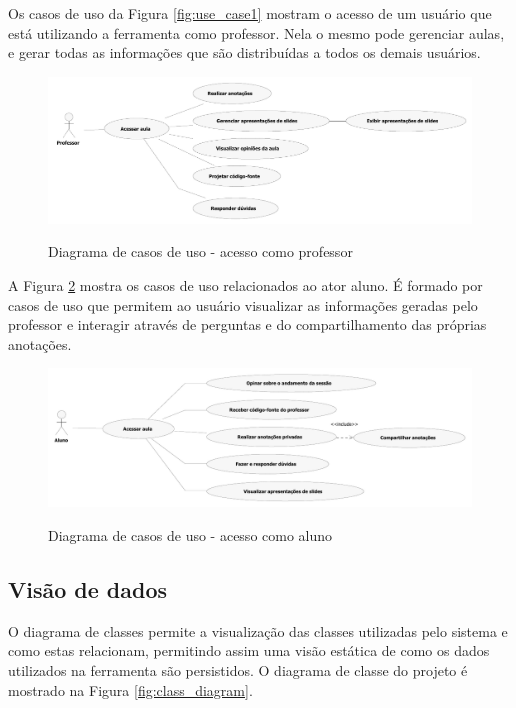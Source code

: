 Os casos de uso da Figura \ref{fig:use_case1} mostram o acesso de um usuário que está utilizando a ferramenta como professor. Nela o mesmo pode gerenciar aulas, e gerar todas as informações que são distribuídas a todos os demais usuários.
 

\begin{figure}[!h]
\centering
\caption{Diagrama de casos de uso - acesso como professor}
\includegraphics[width=1.0\textwidth]{pdfs/img-use-case2.pdf} 
\label{fig:use_case2} 
\end{figure}

A Figura \ref{fig:use_case3} mostra os casos de uso relacionados ao ator aluno. É formado por casos de uso que permitem ao usuário visualizar as informações geradas pelo professor e interagir através de perguntas e do compartilhamento das próprias anotações.

 
\begin{figure}[!h]
\centering
\caption{Diagrama de casos de uso - acesso como aluno}
\includegraphics[width=1.0\textwidth]{pdfs/img-use-case3.pdf} 
\label{fig:use_case3} 
\end{figure}

\subsection{Visão de dados}

O diagrama de classes permite a visualização das classes utilizadas pelo sistema e como estas relacionam, permitindo assim uma visão estática de como os dados utilizados na ferramenta são persistidos. O diagrama de classe do projeto é mostrado na Figura \ref{fig:class_diagram}.


